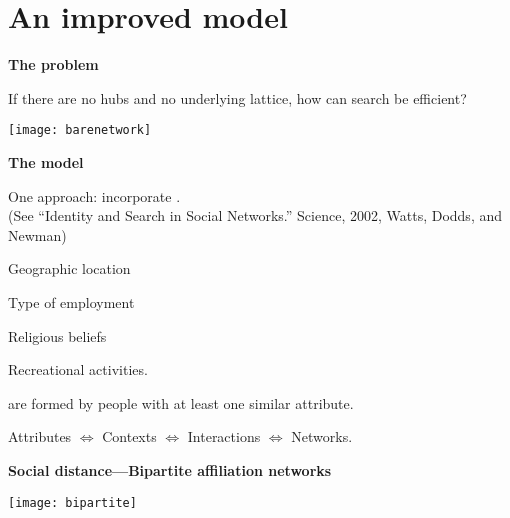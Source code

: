   

\section{An improved model}

  \textbf{The problem}

  If there are no hubs and no underlying lattice,
  how can search be efficient?

  \texttt{[image: barenetwork]}%



  \textbf{The model}

  One approach: incorporate .\\
  \small{(See ``Identity and Search in Social Networks.'' Science, 2002,  Watts, Dodds, and Newman\cite{watts2002b})}

  \bigskip

  \textbf{}
    
     
      Geographic location
     
      Type of employment
     
      Religious beliefs
     
      Recreational activities.
    
  

  \bigskip

  {
     are formed by people with at least one similar attribute.
  }

  \bigskip

  {
    Attributes $\Leftrightarrow$ 
    Contexts $\Leftrightarrow$ 
    Interactions $\Leftrightarrow$ 
    Networks.
  }


  \textbf{Social distance---Bipartite affiliation networks}

  \centering
  \texttt{[image: bipartite]}

